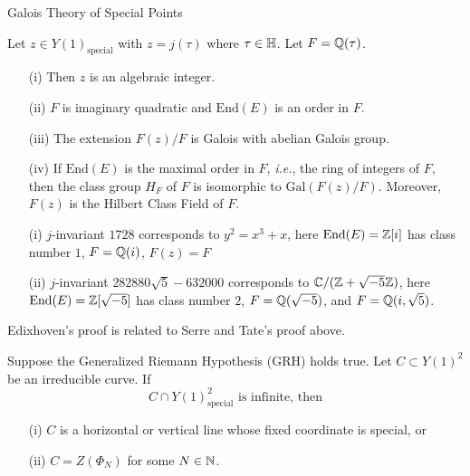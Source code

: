 \documentclass{beamer}
\begin{document}
\begin{frame}{Galois Theory of Special Points}  
  \begin{theorem}
    Let $z\in Y(1)_{\mathrm{special}}$ with $z=j(\tau)$ where
    $\tau\in {\mathbb{H}}$. Let $F={\mathbb{Q}}(\tau)$.
    \begin{enumerate}
    \item [(i)] Then $z$ is an algebraic integer.
    \item[(ii)]  $F$ is
      imaginary quadratic and   $\mathrm{End}(E)$ is an order
      in $F$.
    \item[(iii)] The extension $F(z)/F$ is Galois with abelian Galois
      group.
    \item[(iv)] If $\mathrm{End}(E)$ is the maximal order in $F$,
      \textit{i.e.}, the ring of integers of $F$, then
      the class group $H_F$ of $F$ is isomorphic to
      $\mathrm{Gal}(F(z)/F)$.
      Moreover, $F(z)$ is the Hilbert Class Field of $F$. 
    \end{enumerate}
  \end{theorem}
  \begin{example}
    \begin{enumerate}
    \item [(i)] $j$-invariant $1728$ corresponds to $y^2 = x^3+x$, here
      $\mathrm{End}(E) = {\mathbb{Z}}[i]$ has class number $1$,
      $F={\mathbb{Q}}(i)$,
      $F(z)=F$
    \end{enumerate}
  \end{example}
\end{frame}

\begin{frame}
  \begin{example}[continued]
    \begin{enumerate}
    \item[(ii)] $j$-invariant $282880 \sqrt{5}-632000$ corresponds to
      ${\mathbb{C}}/({\mathbb{Z}}+\sqrt{-5}{\mathbb{Z}})$, here $\mathrm{End}(E)={\mathbb{Z}}[\sqrt{-5}]$
      has class number $2$, $F={\mathbb{Q}}(\sqrt{-5})$, and $F =
      {\mathbb{Q}}(i,\sqrt{5})$. 
    \end{enumerate}
  \end{example}

  Edixhoven's proof is related to Serre and Tate's proof above.
  \begin{theorem}
    Suppose the Generalized Riemann Hypothesis (GRH) holds true. 
    Let $C\subset Y(1)^2$ be an irreducible curve. If
    \begin{equation*}
      C \cap Y(1)^2_{\mathrm{special}}\text{ is
        infinite, then}
    \end{equation*}
    \vspace{-0.75cm}
    \begin{enumerate}
    \item [(i)] $C$ is a horizontal or vertical line whose fixed coordinate
      is  special, or
    \item[(ii)] $C=Z(\Phi_N)$ for some $N\in{\mathbb{N}}$. 
    \end{enumerate}
  \end{theorem}
\end{frame}
\end{document}
